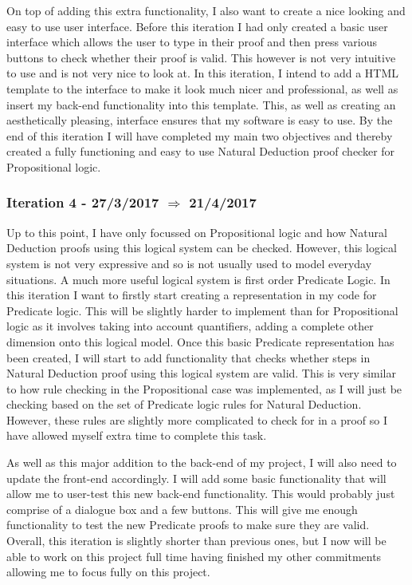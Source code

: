 On top of adding this extra functionality, I also want to create a nice looking and easy to use user interface. Before this iteration I had only created a basic user interface which allows the user to type in their proof and then press various buttons to check whether their proof is valid. This however is not very intuitive to use and is not very nice to look at. In this iteration, I intend to add a HTML template to the interface to make it look much nicer and professional, as well as insert my back-end functionality into this template. This, as well as creating an aesthetically pleasing, interface ensures that my software is easy to use. By the end of this iteration I will have completed my main two objectives and thereby created a fully functioning and easy to use Natural Deduction proof checker for Propositional logic.

\subsubsection{Iteration 4 - 27/3/2017 $\Rightarrow$ 21/4/2017}

Up to this point, I have only focussed on Propositional logic and how Natural Deduction proofs using this logical system can be checked. However, this logical system is not very expressive and so is not usually used to model everyday situations. A much more useful logical system is first order Predicate Logic. In this iteration I want to firstly start creating a representation in my code for Predicate logic. This will be slightly harder to implement than for Propositional logic as it involves taking into account quantifiers, adding a complete other dimension onto this logical model. Once this basic Predicate representation has been created, I will start to add functionality that checks whether steps in Natural Deduction proof using this logical system are valid. This is very similar to how rule checking in the Propositional case was implemented,  as I will just be checking based on the set of Predicate logic rules for Natural Deduction. However, these rules are slightly more complicated to check for in a proof so I have allowed myself extra time to complete this task. 

As well as this major addition to the back-end of my project, I will also need to update the front-end accordingly. I will add some basic functionality that will allow me to user-test this new back-end functionality. This would probably just comprise of a dialogue box and a few buttons. This will give me enough functionality to test the new Predicate proofs to make sure they are valid. Overall, this iteration is slightly shorter than previous ones, but I now will be able to work on this project full time having finished my other commitments allowing me to focus fully on this project. 

